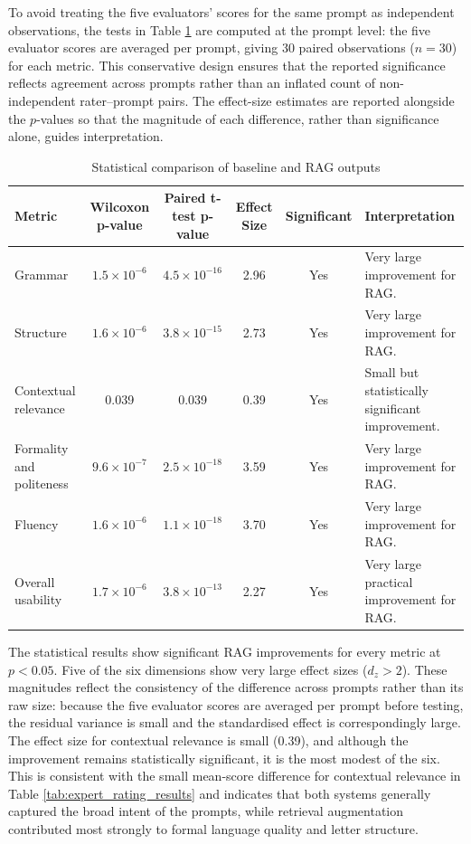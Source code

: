 \documentclass[12pt]{uomthesis}
\begin{document}
To avoid treating the five evaluators' scores for the same prompt as independent observations, the tests in Table \ref{tab:statistical_results} are computed at the prompt level: the five evaluator scores are averaged per prompt, giving 30 paired observations ($n = 30$) for each metric. This conservative design ensures that the reported significance reflects agreement across prompts rather than an inflated count of non-independent rater--prompt pairs. The effect-size estimates are reported alongside the $p$-values so that the magnitude of each difference, rather than significance alone, guides interpretation.

\begin{table}[!htbp]
\centering
\small
\begin{tabularx}{\linewidth}{@{}lccccX@{}}
\toprule
\textbf{Metric} & \textbf{Wilcoxon p-value} & \textbf{Paired t-test p-value} & \textbf{Effect Size} & \textbf{Significant} & \textbf{Interpretation} \\
\midrule
Grammar & $1.5 \times 10^{-6}$ & $4.5 \times 10^{-16}$ & 2.96 & Yes & Very large improvement for RAG. \\
Structure & $1.6 \times 10^{-6}$ & $3.8 \times 10^{-15}$ & 2.73 & Yes & Very large improvement for RAG. \\
Contextual relevance & 0.039 & 0.039 & 0.39 & Yes & Small but statistically significant improvement. \\
Formality and politeness & $9.6 \times 10^{-7}$ & $2.5 \times 10^{-18}$ & 3.59 & Yes & Very large improvement for RAG. \\
Fluency & $1.6 \times 10^{-6}$ & $1.1 \times 10^{-18}$ & 3.70 & Yes & Very large improvement for RAG. \\
Overall usability & $1.7 \times 10^{-6}$ & $3.8 \times 10^{-13}$ & 2.27 & Yes & Very large practical improvement for RAG. \\
\bottomrule
\end{tabularx}
\caption{Statistical comparison of baseline and RAG outputs}
\label{tab:statistical_results}
\end{table}

The statistical results show significant RAG improvements for every metric at $p < 0.05$. Five of the six dimensions show very large effect sizes ($d_z > 2$). These magnitudes reflect the consistency of the difference across prompts rather than its raw size: because the five evaluator scores are averaged per prompt before testing, the residual variance is small and the standardised effect is correspondingly large. The effect size for contextual relevance is small (0.39), and although the improvement remains statistically significant, it is the most modest of the six. This is consistent with the small mean-score difference for contextual relevance in Table \ref{tab:expert_rating_results} and indicates that both systems generally captured the broad intent of the prompts, while retrieval augmentation contributed most strongly to formal language quality and letter structure.
\end{document}
